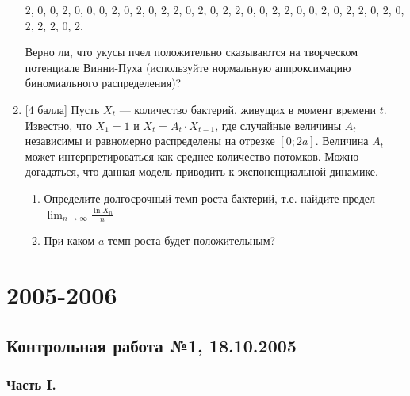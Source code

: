 \documentclass[12pt, a4paper]{article}\usepackage[]{graphicx}\usepackage[]{color}
\begin{document}
\begin{enumerate}
2, 0, 0, 2, 0, 0, 0, 2, 0, 2, 0, 2, 2, 0, 2, 0, 2, 2, 0, 0, 2, 2, 0, 0, 2, 0, 2, 2, 0, 2, 0, 2, 2, 2, 0, 2.

Верно ли, что укусы пчел положительно сказываются на творческом потенциале Винни-Пуха
(используйте нормальную аппроксимацию биномиального распределения)?
\item $[$4 балла] Пусть $X_t$ — количество бактерий, живущих в момент времени $t$. Известно, что $X_1 =1$ и $X_t = A_t \cdot X_{t-1}$, где случайные величины $A_t$ независимы и равномерно
распределены на отрезке $[0; 2a]$. Величина $A_t$ может интерпретироваться как среднее
количество потомков. Можно догадаться, что данная модель приводить к экспоненциальной динамике.
\begin{enumerate}
\item Определите долгосрочный темп роста бактерий, т.е. найдите предел $\lim_{n\to\infty}\frac{\ln X_n}{n}$
\item При каком $a$ темп роста будет положительным?
\end{enumerate}


\end{enumerate}



\section{2005-2006}





\subsection{Контрольная работа №1, 18.10.2005}

\subsubsection*{Часть I.}
\end{document}
